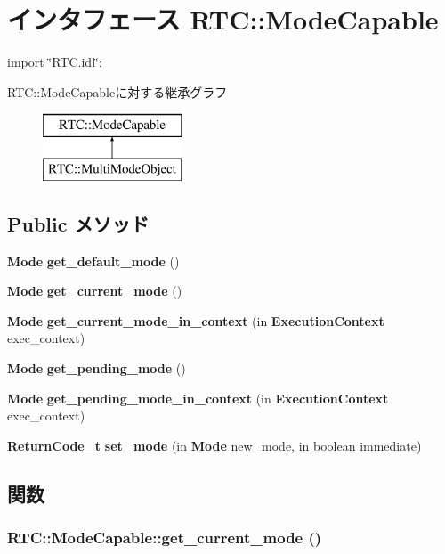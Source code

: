 \section{インタフェース RTC::ModeCapable}
\label{interfaceRTC_1_1ModeCapable}


{\ttfamily import \char`\"{}RTC.idl\char`\"{};}

RTC::ModeCapableに対する継承グラフ\begin{figure}[H]
\begin{center}
\leavevmode
\includegraphics[height=2cm]{interfaceRTC_1_1ModeCapable}
\end{center}
\end{figure}
\subsection*{Public メソッド}
\begin{DoxyCompactItemize}
\item 
{\bf Mode} {\bf get\_\-default\_\-mode} ()
\item 
{\bf Mode} {\bf get\_\-current\_\-mode} ()
\item 
{\bf Mode} {\bf get\_\-current\_\-mode\_\-in\_\-context} (in {\bf ExecutionContext} exec\_\-context)
\item 
{\bf Mode} {\bf get\_\-pending\_\-mode} ()
\item 
{\bf Mode} {\bf get\_\-pending\_\-mode\_\-in\_\-context} (in {\bf ExecutionContext} exec\_\-context)
\item 
{\bf ReturnCode\_\-t} {\bf set\_\-mode} (in {\bf Mode} new\_\-mode, in boolean immediate)
\end{DoxyCompactItemize}


\subsection{関数}
\subsubsection[{get\_\-current\_\-mode}]{ RTC::ModeCapable::get\_\-current\_\-mode ()}\label{interfaceRTC_1_1ModeCapable_a2adc0d8a34dc2a166fb29fc4fdf49133}
